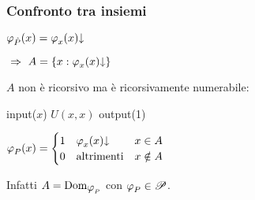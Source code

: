 \subsubsection{Confronto tra insiemi}
\begin{minipage}{.4\textwidth}
    {$\semRAM_{\hat{P}}(x)=\semRAM_x(x)\termina$}
\end{minipage}
\begin{minipage}{.49\textwidth}
    $\ \Rightarrow\ A = \{x: \semRAM_x(x)\termina \}$
\end{minipage}\vspace{.6em}

$A$ non è ricorsivo ma è ricorsivamente numerabile:

\vspace{1em}\hspace{5em}
\begin{minipage}{.24\textwidth}
    \begin{tcolorbox}[
        colback=white,
        sharp corners,
        boxrule=.3mm,
        left=20pt,
        top=0pt,
        bottom=0pt,
        title=$P$,
        colbacktitle=white,
        coltitle=black
    ]
    \begin{algorithm}[H]
        \SetAlgoNoEnd
        input($x$)\;
        $U(x,x)$\;
        output(1)\;
    \end{algorithm}
    \end{tcolorbox}
\end{minipage}
\begin{minipage}{.49\textwidth}
    \hspace{3em}$\semRAM_P(x)=\begin{cases}
        1 & \semRAM_x(x)\termina \hspace{23pt}  x\in A \\
        0 & \text{altrimenti}  \quad x\notin A
    \end{cases}$
\end{minipage}\vspace{.6em}

Infatti $A=\text{Dom}_{\semRAM_P}$ con $\semRAM_P\in\ricPar$.
\vspace{1.5em}


